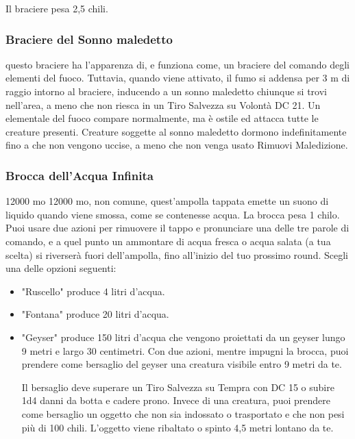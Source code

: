 \begin{multicols}{2}
Il braciere pesa 2,5 chili.

\subsubsection*{Braciere del Sonno maledetto}
questo braciere ha l'apparenza di, e funziona come, un braciere del comando degli elementi del fuoco. Tuttavia, quando viene attivato, il fumo si addensa per 3 m di raggio intorno al braciere, inducendo a un sonno maledetto chiunque si trovi nell'area, a meno che non riesca in un Tiro Salvezza su Volontà DC 21. Un elementale del fuoco compare normalmente, ma è ostile ed attacca tutte le creature presenti. Creature soggette al sonno maledetto dormono indefinitamente fino a che non vengono uccise, a meno che non venga usato Rimuovi Maledizione.

\subsubsection*{Brocca dell'Acqua Infinita} 12000 mo 12000 mo, non comune, quest'ampolla tappata emette un suono di liquido quando viene smossa, come se contenesse acqua. La brocca pesa 1 chilo. Puoi usare due azioni per rimuovere il tappo e pronunciare una delle tre parole di comando, e a quel punto un ammontare di acqua fresca o acqua salata (a tua scelta) si riverserà fuori dell'ampolla, fino all'inizio del tuo prossimo round. Scegli una delle opzioni seguenti:

\medskip

\begin{itemize}
\item
"Ruscello" produce 4 litri d'acqua.
\item
"Fontana" produce 20 litri d'acqua.
\item
"Geyser" produce 150 litri d'acqua che vengono proiettati da un geyser lungo 9 metri e largo 30 centimetri. Con due azioni, mentre impugni la brocca, puoi prendere come bersaglio del geyser una creatura visibile entro 9 metri da te.

Il bersaglio deve superare un Tiro Salvezza su Tempra con DC 15 o subire 1d4 danni da botta e cadere prono. Invece di una creatura, puoi prendere come bersaglio un oggetto che non sia indossato o trasportato e che non pesi più di 100 chili. L'oggetto viene ribaltato o spinto 4,5 metri lontano da te.
\end{itemize}


\end{multicols}
